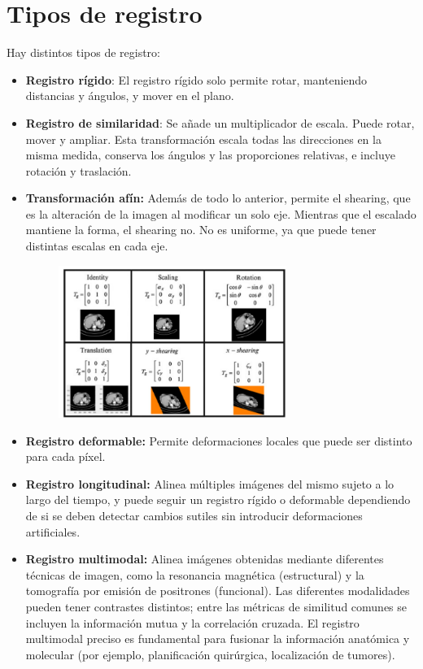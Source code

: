 \section{Tipos de registro}
Hay distintos tipos de registro:
\begin{itemize}
\item \textbf{Registro rígido}: El registro rígido solo permite rotar, manteniendo distancias y ángulos, y mover en el plano.
\item \textbf{Registro de similaridad}: Se añade un multiplicador de escala. Puede rotar, mover y ampliar. Esta transformación escala todas las direcciones en la misma medida, conserva los ángulos y las proporciones relativas, e incluye rotación y traslación.
\item \textbf{Transformación afín:} Además de todo lo anterior, permite el shearing, que es la alteración de la imagen al modificar un solo eje. Mientras que el escalado mantiene la forma, el shearing no. No es uniforme, ya que puede tener distintas escalas en cada eje.

\begin{figure}[h]
\centering
\includegraphics[width = 0.7\textwidth]{figs/registration.png}
\end{figure}

\item \textbf{Registro deformable:} Permite deformaciones locales que puede ser distinto para cada píxel. 
\item \textbf{Registro longitudinal:} Alinea múltiples imágenes del mismo sujeto a lo largo del tiempo, y puede seguir un registro rígido o deformable dependiendo de si se deben detectar cambios sutiles sin introducir deformaciones artificiales.
\item \textbf{Registro multimodal:} Alinea imágenes obtenidas mediante diferentes técnicas de imagen, como la resonancia magnética (estructural) y la tomografía por emisión de positrones (funcional). Las diferentes modalidades pueden tener contrastes distintos; entre las métricas de similitud comunes se incluyen la información mutua y la correlación cruzada. El registro multimodal preciso es fundamental para fusionar la información anatómica y molecular (por ejemplo, planificación quirúrgica, localización de tumores).
\end{itemize}

